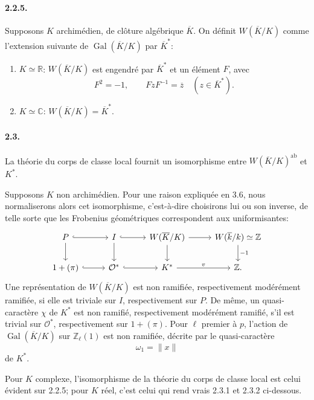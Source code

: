 \documentclass[10pt]{article}
\newcommand{\C}{\mathbb C}
\newcommand{\Z}{\mathbb Z}
\newcommand{\Gal}{\operatorname{Gal}}
\providecommand{\ab}{\mathrm{ab}}
\providecommand{\R}{\mathbb R}
\providecommand{\ab}{\mathrm{ab}}
\begin{document}
\paragraph{2.2.5.} Supposons \(K\) archimédien, de clôture algébrique \(\overline K\). On définit \(W(\overline K/K)\) comme l'extension suivante de \(\Gal(\overline K/K)\) par \(\overline K^*\):
\begin{enumerate}[label=\arabic*)]
\item \(K\simeq\R\): \(W(\overline K/K)\) est engendré par \(\overline K^*\) et un élément \(F\), avec
\[
F^2=-1,\qquad FzF^{-1}=\overline z\quad(z\in\overline K^*).
\]
\item \(K\simeq\C\): \(W(\overline K/K)=\overline K^*\).
\end{enumerate}

\paragraph{2.3.} La théorie du corps de classe local fournit un isomorphisme entre \(W(\overline K/K)^{\ab}\) et \(K^*\).

Supposons \(K\) non archimédien. Pour une raison expliquée en 3.6, nous normaliserons alors cet isomorphisme, c'est-à-dire choisirons lui ou son inverse, de telle sorte que les Frobenius géométriques correspondent aux uniformisantes:
\[
\begin{tikzcd}[column sep=2.7em,row sep=1.9em]
P \arrow[r,hook] \arrow[d] & I \arrow[r,hook] \arrow[d] &
W(\overline K/K) \arrow[r] \arrow[d] &
W(\overline k/k)\simeq\Z \arrow[d,"{-1}"]\\
1+(\pi) \arrow[r,hook] & \mathcal O^* \arrow[r,hook] &
K^* \arrow[r,"v"] & \Z .
\end{tikzcd}
\]
Une représentation de \(W(\overline K/K)\) est non ramifiée, respectivement modérément ramifiée, si elle est triviale sur \(I\), respectivement sur \(P\). De même, un quasi-caractère \(\chi\) de \(K^*\) est non ramifié, respectivement modérément ramifié, s'il est trivial sur \(\mathcal O^*\), respectivement sur \(1+(\pi)\). Pour \(\ell\) premier à \(p\), l'action de \(\Gal(\overline K/K)\) sur \(\Z_\ell(1)\) est non ramifiée, décrite par le quasi-caractère
\[
\omega_1=\|x\|
\]
de \(K^*\).

Pour \(K\) complexe, l'isomorphisme de la théorie du corps de classe local est celui évident sur 2.2.5; pour \(K\) réel, c'est celui qui rend vrais 2.3.1 et 2.3.2 ci-dessous.
\end{document}
